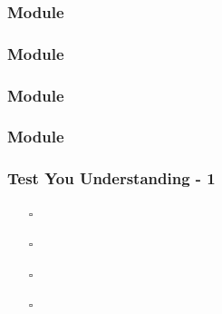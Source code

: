 \documentclass[t, notes, xcolor=table]{beamer}
\begin{document}
\begin{frame}
\frametitle{Module}

\end{frame}
\note{
\scriptsize{


}
}

\begin{frame}
\frametitle{Module}

\end{frame}
\note{
\scriptsize{


}
}

\begin{frame}
\frametitle{Module}

\end{frame}
\note{
\scriptsize{


}
}

\begin{frame}
\frametitle{Module}

\end{frame}
\note{
\scriptsize{


}
}








\begin{frame}
\frametitle{Test You Understanding - 1}

\begin{itemize}
\item[$\square$] 
\item[$\square$] 
\item[$\square$] 
\item[$\square$] 
\end{itemize}
\end{frame}
\note{

}
\end{document}

